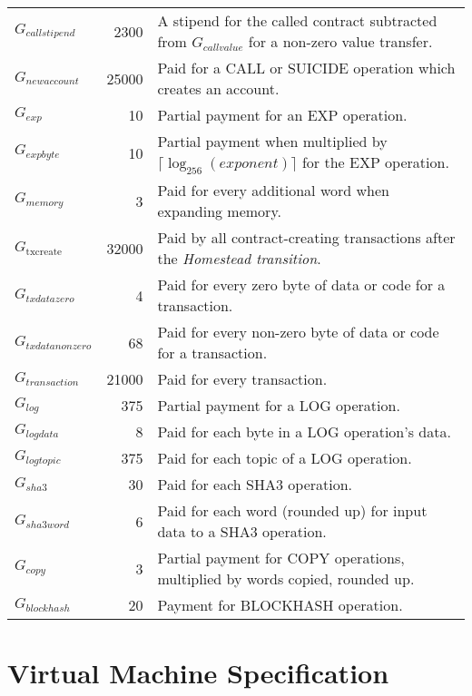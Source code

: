 \documentclass[9pt,oneside]{amsart}
\begin{document}
\begin{tabular*}{\columnwidth}[h]{lrl}
$G_{callstipend}$ & 2300 & A stipend for the called contract subtracted from $G_{callvalue}$ for a non-zero value transfer. \\
$G_{newaccount}$ & 25000 & Paid for a {\small CALL} or {\small SUICIDE} operation which creates an account. \\
$G_{exp}$ & 10 & Partial payment for an {\small EXP} operation. \\
$G_{expbyte}$ & 10 & Partial payment when multiplied by $\lceil\log_{256}(exponent)\rceil$ for the {\small EXP} operation. \\
$G_{memory}$ & 3 & Paid for every additional word when expanding memory. \\
$G_\text{txcreate}$ & 32000 & Paid by all contract-creating transactions after the {\it Homestead transition}.\\
$G_{txdatazero}$ & 4 & Paid for every zero byte of data or code for a transaction. \\
$G_{txdatanonzero}$ & 68 & Paid for every non-zero byte of data or code for a transaction. \\
$G_{transaction}$ & 21000 & Paid for every transaction. \\
$G_{log}$ & 375 & Partial payment for a {\small LOG} operation. \\
$G_{logdata}$ & 8 & Paid for each byte in a {\small LOG} operation's data. \\
$G_{logtopic}$ & 375 & Paid for each topic of a {\small LOG} operation. \\
$G_{sha3}$ & 30 & Paid for each {\small SHA3} operation. \\
$G_{sha3word}$ & 6 & Paid for each word (rounded up) for input data to a {\small SHA3} operation. \\
$G_{copy}$ & 3 & Partial payment for {\small *COPY} operations, multiplied by words copied, rounded up. \\
$G_{blockhash}$ & 20 & Payment for {\small BLOCKHASH} operation. \\

\bottomrule
\end{tabular*}

\section{Virtual Machine Specification}\label{app:vm}
\end{document}
